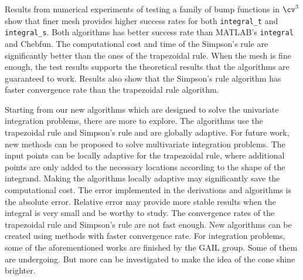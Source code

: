 \documentclass{iitthesis}
\theoremstyle{definition}
\theoremstyle{remark}
\begin{document}
Results from numerical experiments of testing a family of bump functions in $\cv^3$ show that finer mesh provides higher success rates for both {\tt integral\_t} and {\tt integral\_s}. Both algorithms has better success rate than MATLAB's {\tt integral} and Chebfun. The computational cost and time of the Simpson's rule are significantly better than the ones of the trapezoidal rule. When the mesh is fine enough, the test results supports the theoretical results that the algorithms are guaranteed to work. Results also show that the Simpson's rule algorithm has faster convergence rate than the trapezoidal rule algorithm.


Starting from our new algorithms which are designed to solve the univariate integration problems, there are more to explore. The algorithms use the trapezoidal rule and Simpson's rule and are globally adaptive. For future work, new methods can be proposed to solve multivariate integration problems. The input points can be locally adaptive for the trapezoidal rule, where additional points are only added to the necessary locations according to the shape of the integrand. Making the algorithms locally adaptive may significantly save the computational cost. The error implemented in the derivations and algorithms is the absolute error. Relative error may provide more stable results when the integral is very small and be worthy to study. The convergence rates of the trapezoidal rule and Simpson's rule are not fast enough. New algorithms can be created using methods with faster convergence rate. For integration problems, some of the aforementioned works are finished by the GAIL group. Some of them are undergoing. But more can be investigated to make the idea of the cone shine brighter.



\clearpage


%
%
%
%
%
%
%
%
%
%
%
%

%


\end{document}
